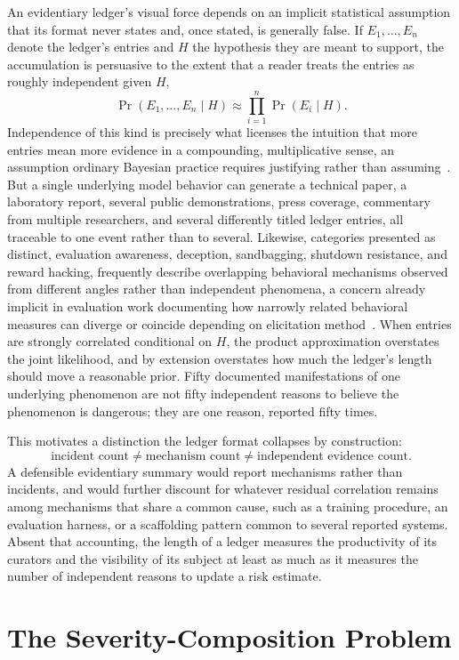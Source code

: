 \documentclass[11pt]{article}
\begin{document}
An evidentiary ledger's visual force depends on an implicit statistical assumption that its format never states and, once stated, is generally false. If $E_1, \dots, E_n$ denote the ledger's entries and $H$ the hypothesis they are meant to support, the accumulation is persuasive to the extent that a reader treats the entries as roughly independent given $H$,
\[
\Pr(E_1, \dots, E_n \mid H) \approx \prod_{i=1}^{n} \Pr(E_i \mid H).
\]
Independence of this kind is precisely what licenses the intuition that more entries mean more evidence in a compounding, multiplicative sense, an assumption ordinary Bayesian practice requires justifying rather than assuming~\cite{gelman2013}. But a single underlying model behavior can generate a technical paper, a laboratory report, several public demonstrations, press coverage, commentary from multiple researchers, and several differently titled ledger entries, all traceable to one event rather than to several. Likewise, categories presented as distinct, evaluation awareness, deception, sandbagging, shutdown resistance, and reward hacking, frequently describe overlapping behavioral mechanisms observed from different angles rather than independent phenomena, a concern already implicit in evaluation work documenting how narrowly related behavioral measures can diverge or coincide depending on elicitation method~\cite{perez2022discovering,metrFrontierRisk2026}. When entries are strongly correlated conditional on $H$, the product approximation overstates the joint likelihood, and by extension overstates how much the ledger's length should move a reasonable prior. Fifty documented manifestations of one underlying phenomenon are not fifty independent reasons to believe the phenomenon is dangerous; they are one reason, reported fifty times.

This motivates a distinction the ledger format collapses by construction:
\[
\boxed{\text{incident count} \neq \text{mechanism count} \neq \text{independent evidence count}.}
\]
A defensible evidentiary summary would report mechanisms rather than incidents, and would further discount for whatever residual correlation remains among mechanisms that share a common cause, such as a training procedure, an evaluation harness, or a scaffolding pattern common to several reported systems. Absent that accounting, the length of a ledger measures the productivity of its curators and the visibility of its subject at least as much as it measures the number of independent reasons to update a risk estimate.

\section{The Severity-Composition Problem}
\end{document}
